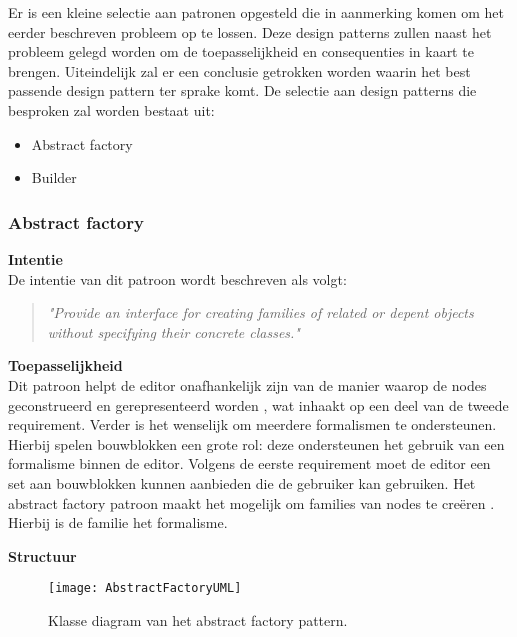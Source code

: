 Er is een kleine selectie aan patronen opgesteld die in aanmerking komen om het eerder beschreven probleem op te lossen. Deze design patterns zullen naast het probleem gelegd worden om de toepasselijkheid en consequenties in kaart te brengen. Uiteindelijk zal er een conclusie getrokken worden waarin het best passende design pattern ter sprake komt. De selectie aan design patterns die besproken zal worden bestaat uit:

\begin{itemize}
    \item Abstract factory
    \item Builder
\end{itemize}


\subsubsection{Abstract factory}
\noindent\textbf{Intentie}\\
De intentie van dit patroon wordt beschreven als volgt\cite{DesignPatterns}\cite{SourceMakingAbstractFactory}:
\begin{quote} 
    \centering    
    \textit{
        "Provide an interface for creating families of related or depent objects without specifying their concrete classes."       
    }
\end{quote}

\noindent\textbf{Toepasselijkheid}\\
Dit patroon helpt de editor onafhankelijk zijn van de manier waarop de nodes geconstrueerd en gerepresenteerd worden \cite{DesignPatterns}, wat inhaakt op een deel van de tweede requirement. Verder is het wenselijk om meerdere formalismen te ondersteunen. Hierbij spelen bouwblokken een grote rol: deze ondersteunen het gebruik van een formalisme binnen de editor. Volgens de eerste requirement moet de editor een set aan bouwblokken kunnen aanbieden die de gebruiker kan gebruiken. Het abstract factory patroon maakt het mogelijk om families van nodes te creëren \cite{DesignPatterns}. Hierbij is de familie het formalisme.
\newline

\noindent\textbf{Structuur}

\begin{figure}[H]
    \centering    
    \texttt{[image: AbstractFactoryUML]}
    \caption[]{Klasse diagram van het abstract factory pattern. \footnotemark}
    \label{fig:abstractfactoryuml}
\end{figure}

